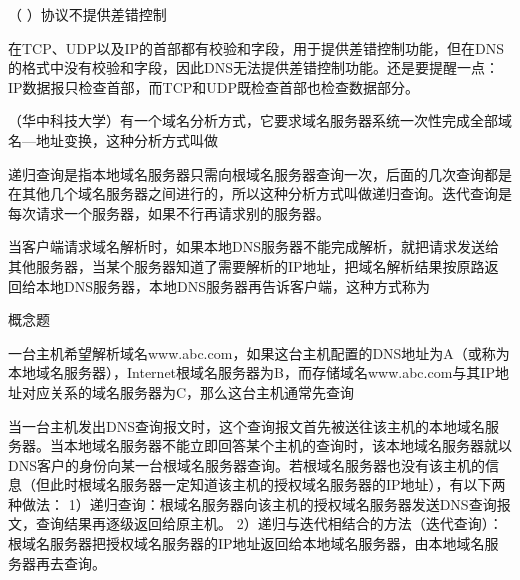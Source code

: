 \question （ ）协议不提供差错控制
\par{}
\begin{solution}在TCP、UDP以及IP的首部都有校验和字段，用于提供差错控制功能，但在DNS的格式中没有校验和字段，因此DNS无法提供差错控制功能。还是要提醒一点：IP数据报只检查首部，而TCP和UDP既检查首部也检查数据部分。
\end{solution}
\question （华中科技大学）有一个域名分析方式，它要求域名服务器系统一次性完成全部域名---地址变换，这种分析方式叫做
\par{}
\begin{solution}递归查询是指本地域名服务器只需向根域名服务器查询一次，后面的几次查询都是在其他几个域名服务器之间进行的，所以这种分析方式叫做递归查询。迭代查询是每次请求一个服务器，如果不行再请求别的服务器。
\end{solution}
\question 当客户端请求域名解析时，如果本地DNS服务器不能完成解析，就把请求发送给其他服务器，当某个服务器知道了需要解析的IP地址，把域名解析结果按原路返回给本地DNS服务器，本地DNS服务器再告诉客户端，这种方式称为
\par{}
\begin{solution}概念题
\end{solution}
\question 一台主机希望解析域名www.abc.com，如果这台主机配置的DNS地址为A（或称为本地域名服务器），Internet根域名服务器为B，而存储域名www.abc.com与其IP地址对应关系的域名服务器为C，那么这台主机通常先查询
\par{}
\begin{solution}当一台主机发出DNS查询报文时，这个查询报文首先被送往该主机的本地域名服务器。当本地域名服务器不能立即回答某个主机的查询时，该本地域名服务器就以DNS客户的身份向某一台根域名服务器查询。若根域名服务器也没有该主机的信息（但此时根域名服务器一定知道该主机的授权域名服务器的IP地址），有以下两种做法：
1）递归查询：根域名服务器向该主机的授权域名服务器发送DNS查询报文，查询结果再逐级返回给原主机。
2）递归与迭代相结合的方法（迭代查询）：根域名服务器把授权域名服务器的IP地址返回给本地域名服务器，由本地域名服务器再去查询。
\end{solution}
